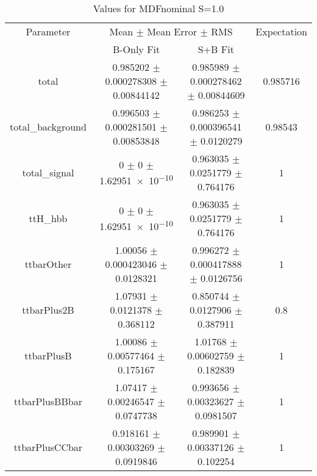 \begin{table}
\centering
\caption{Values for MDFnominal S=1.0}
\begin{tabular}{cccc}
\toprule
Parameter & \multicolumn{2}{c}{Mean $\pm$ Mean Error $\pm$ RMS} & Expectation\\
 & B-Only Fit & S+B Fit & \\
\midrule
total & \num{0.985202} $\pm$ \num{0.000278308} $\pm$ \num{0.00844142} & \num{0.985989} $\pm$ \num{0.000278462} $\pm$ \num{0.00844609} & \num{0.985716}\\
total\_background & \num{0.996503} $\pm$ \num{0.000281501} $\pm$ \num{0.00853848} & \num{0.986253} $\pm$ \num{0.000396541} $\pm$ \num{0.0120279} & \num{0.98543}\\
total\_signal & \num{0} $\pm$ \num{0} $\pm$ \num{1.62951e-10} & \num{0.963035} $\pm$ \num{0.0251779} $\pm$ \num{0.764176} & \num{1}\\
ttH\_hbb & \num{0} $\pm$ \num{0} $\pm$ \num{1.62951e-10} & \num{0.963035} $\pm$ \num{0.0251779} $\pm$ \num{0.764176} & \num{1}\\
ttbarOther & \num{1.00056} $\pm$ \num{0.000423046} $\pm$ \num{0.0128321} & \num{0.996272} $\pm$ \num{0.000417888} $\pm$ \num{0.0126756} & \num{1}\\
ttbarPlus2B & \num{1.07931} $\pm$ \num{0.0121378} $\pm$ \num{0.368112} & \num{0.850744} $\pm$ \num{0.0127906} $\pm$ \num{0.387911} & \num{0.8}\\
ttbarPlusB & \num{1.00086} $\pm$ \num{0.00577464} $\pm$ \num{0.175167} & \num{1.01768} $\pm$ \num{0.00602759} $\pm$ \num{0.182839} & \num{1}\\
ttbarPlusBBbar & \num{1.07417} $\pm$ \num{0.00246547} $\pm$ \num{0.0747738} & \num{0.993656} $\pm$ \num{0.00323627} $\pm$ \num{0.0981507} & \num{1}\\
ttbarPlusCCbar & \num{0.918161} $\pm$ \num{0.00303269} $\pm$ \num{0.0919846} & \num{0.989901} $\pm$ \num{0.00337126} $\pm$ \num{0.102254} & \num{1}\\
\bottomrule
\end{tabular}
\end{table}